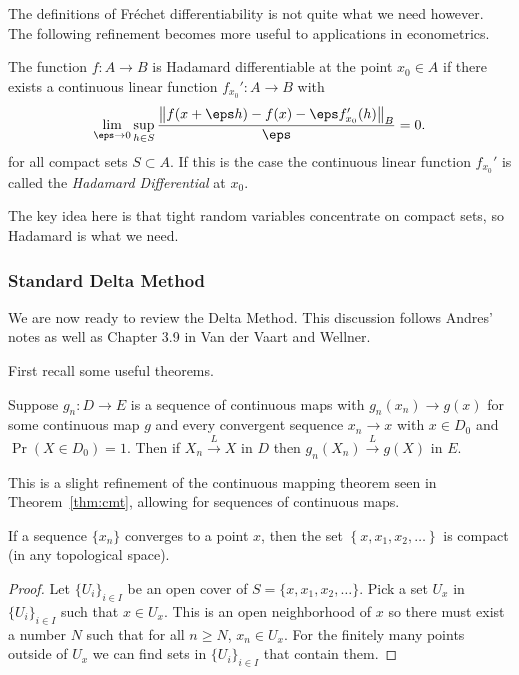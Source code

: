 The definitions of Fréchet differentiability is not quite what we need however. The following refinement becomes more useful to applications in econometrics.

\begin{definition}
	\label{def:hadamard}
	The function \(f:A\to B\) is Hadamard differentiable at the point \(x_0\in A\) if there exists a continuous linear function \(f_{x_0}': A \to B\) with 
	\[
		\lim_{\eps\to 0}\sup_{h\in S} \frac{\left\|f(x+\eps h)-f(x)- \eps f_{x_0}'(h)\right\|_B}{\eps} =0
	.\]
	for all compact sets \(S\subset A\). If this is the case the continuous linear function \(f_{x_0}'\) is called the \textit{Hadamard Differential} at \(x_0\). 
\end{definition}

The key idea here is that tight random variables concentrate on compact sets, so Hadamard is what we need.

\subsubsection{Standard Delta Method}%
\label{subsubsec:standard-delta-method}

We are now ready to review the Delta Method. This discussion follows Andres' notes as well as Chapter 3.9 in Van der Vaart and Wellner. 

First recall some useful theorems.

\begin{theorem}
	\label{thm:cmt-2}
	Suppose \(g_n:D\to E\) is a sequence of continuous maps with \(g_n(x_n)\to g(x)\) for some continuous map \(g\) and every convergent sequence \(x_n \to x\) with \(x \in D_0\) and \(\Pr(X \in D_0) = 1\). Then if \(X_n\overset{L}{\to} X\)	in \(D\) then  \(g_n(X_n)\overset{L}{\to} g(X )\) in \(E\).
\end{theorem}

This is a slight refinement of the continuous mapping theorem seen in Theorem~\ref{thm:cmt}, allowing for sequences of continuous maps.
\begin{lemma}
	\label{lemma:convergent-compact}
	If a sequence \(\{x_n\}\) converges to a point \(x\), then the set  \( \left\{x,x_1,x_2,\dots\right\}\) is compact (in any topological space).
\end{lemma}
\begin{proof}
	Let \(\{U_i\}_{i\in I}\) be an open cover of \(S = \{x,x_1,x_2,\dots\} \). Pick a set \(U_x\) in  \(\{U_i\}_{i\in I}\) such that \(x\in U_x\). This is an open neighborhood of \(x\) so there must exist a number \(N\) such that for all \(n \geq N\), \(x_n \in U_x\). For the finitely many points outside of  \(U_x\) we can find sets in \(\{U_i\}_{i\in I}\) that contain them. 
\end{proof}


